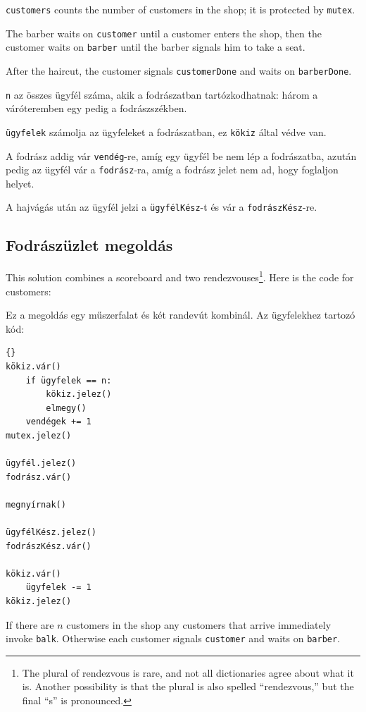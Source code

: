 \documentclass{book}
\newcommand{\clearemptydoublepage}{\newpage\cleardoublepage}
\begin{document}
{\tt customers} counts the number of customers in the shop;
it is protected by {\tt mutex}.

The barber waits on {\tt customer} until a customer enters the
shop, then the customer waits on {\tt barber} until the barber
signals him to take a seat.

After the haircut, the customer signals {\tt customerDone} and
waits on {\tt barberDone}.

{\tt n} az összes ügyfél száma, akik a fodrászatban tartózkodhatnak:
három a váróteremben egy pedig a fodrászszékben.

{\tt ügyfelek} számolja az ügyfeleket a fodrászatban, ez {\tt kökiz} által védve van.

A fodrász addig vár {\tt vendég}-re, amíg egy ügyfél be nem lép a fodrászatba,
azután pedig az ügyfél vár a {\tt fodrász}-ra, amíg a fodrász jelet nem ad, hogy foglaljon helyet.

A hajvágás után az ügyfél jelzi a {\tt ügyfélKész}-t és vár a {\tt fodrászKész}-re. 

\clearemptydoublepage
\subsection{Fodrászüzlet megoldás}

This solution combines a scoreboard and two rendezvouses\footnote{The
  plural of rendezvous is rare, and not all dictionaries agree about
  what it is.  Another possibility is that the plural is also spelled
  ``rendezvous,'' but the final ``s'' is pronounced.}.  Here is the
code for customers:

Ez a megoldás egy műszerfalat és két randevút kombinál. Az ügyfelekhez tartozó kód:



\begin{lstlisting}[title={Fodrászüzlet megoldás (ügyfél)}]{}
kökiz.vár()
    if ügyfelek == n:
        kökiz.jelez()
        elmegy()
    vendégek += 1
mutex.jelez()

ügyfél.jelez()
fodrász.vár()

megnyírnak()

ügyfélKész.jelez()
fodrászKész.vár()

kökiz.vár()
    ügyfelek -= 1
kökiz.jelez()
\end{lstlisting}

If there are $n$ customers in the shop any customers that
arrive immediately invoke {\tt balk}.
Otherwise each customer signals {\tt customer} and waits on
{\tt barber}.
\end{document}
